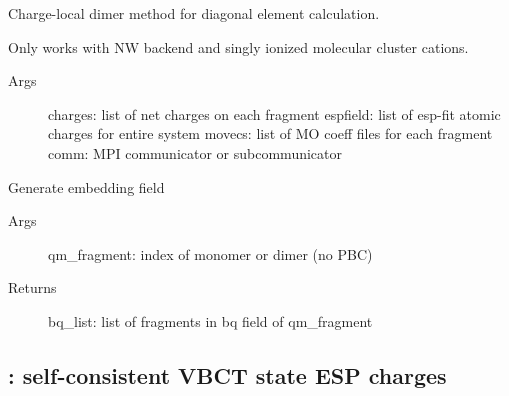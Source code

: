 \documentclass[letterpaper,10pt,english]{sphinxmanual}
\begin{document}

\begin{fulllineitems}
\label{\detokenize{vbct:vbct.vbct_calc.diag_chglocal}}
Charge-local dimer method for diagonal element calculation.

Only works with NW backend and singly ionized molecular cluster cations.
\begin{description}
\item[{Args}] \leavevmode
charges: list of net charges on each fragment
espfield: list of esp-fit atomic charges for entire system
movecs: list of MO coeff files for each fragment
comm: MPI communicator or subcommunicator

\end{description}

\end{fulllineitems}


\begin{fulllineitems}
\label{\detokenize{vbct:vbct.vbct_calc.make_embed_list}}
Generate embedding field
\begin{description}
\item[{Args}] \leavevmode
qm\_fragment: index of monomer or dimer (no PBC)

\item[{Returns}] \leavevmode
bq\_list: list of fragments in bq field of qm\_fragment

\end{description}

\end{fulllineitems}



\subsection{: self-consistent VBCT state ESP charges}
\label{\detokenize{vbct:module-vbct.monomerscf}}\label{\detokenize{vbct:monomerscf-self-consistent-vbct-state-esp-charges}}
\end{document}
